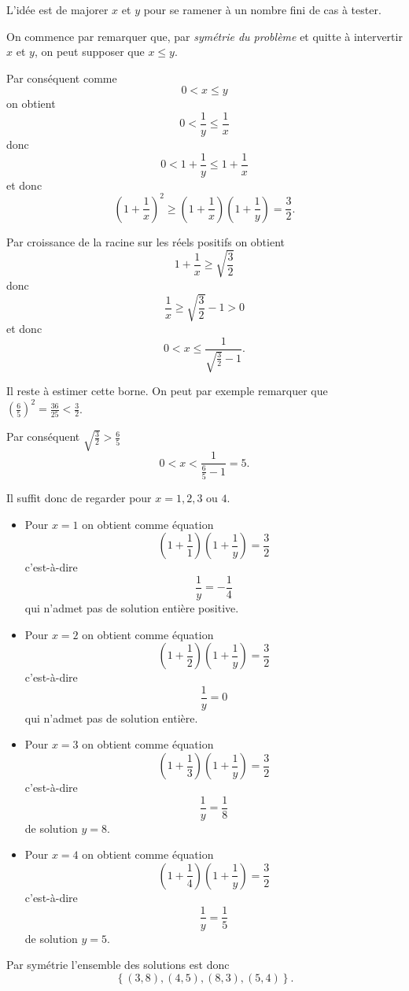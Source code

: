 \begin{sol}
L'idée est de majorer $x$ et $y$ pour se ramener à un nombre fini de cas à tester.

On commence par remarquer que, par \emph{symétrie du problème} et quitte à intervertir $x$ et $y$, on peut supposer que $x \le y$.

Par conséquent comme
$$0 < x \le y$$
on obtient
$$0 < \frac{1}{y} \le \frac{1}{x}$$
donc
$$0 < 1+\frac{1}{y} \le 1+\frac{1}{x}$$
et donc
$$\left(1 + \frac{1}{x} \right)^2 \ge \left( 1 + \frac{1}{x}\right) \left(1 + \frac{1}{y} \right) = \frac{3}{2}.$$

Par croissance de la racine sur les réels positifs on obtient
$$1 + \frac{1}{x} \ge \sqrt{\frac{3}{2}}$$
donc
$$\frac{1}{x} \ge \sqrt{\frac{3}{2}}-1 > 0$$
et donc
$$0 < x \le \frac{1}{\sqrt{\frac{3}{2}}-1}.$$


Il reste à estimer cette borne. On peut par exemple remarquer que $\left( \frac{6}{5}\right)^2 = \frac{36}{25} < \frac{3}{2}$.

Par conséquent $\sqrt{\frac{3}{2}} > \frac{6}{5}$
$$0 < x < \frac{1}{\frac{6}{5}-1} = 5.$$

Il suffit donc de regarder pour $x =1, 2, 3 \text{ ou } 4$.

\begin{itemize}
	\item Pour $x=1$ on obtient comme équation
	$$\left(1 + \frac{1}{1} \right)\left(1 + \frac{1}{y} \right) = \frac{3}{2}$$
	c'est-à-dire
	$$\frac{1}{y} = -\frac{1}{4}$$
	qui n'admet pas de solution entière positive.
	\item Pour $x=2$ on obtient comme équation
	$$\left(1 + \frac{1}{2} \right)\left(1 + \frac{1}{y} \right) = \frac{3}{2}$$
	c'est-à-dire
	$$\frac{1}{y} = 0$$
	qui n'admet pas de solution entière.
	\item Pour $x=3$ on obtient comme équation
	$$\left(1 + \frac{1}{3} \right)\left(1 + \frac{1}{y} \right) = \frac{3}{2}$$
	c'est-à-dire
	$$\frac{1}{y} = \frac{1}{8}$$
	de solution $y=8$.
	\item Pour $x=4$ on obtient comme équation
	$$\left(1 + \frac{1}{4} \right)\left(1 + \frac{1}{y} \right) = \frac{3}{2}$$
	c'est-à-dire
	$$\frac{1}{y} = \frac{1}{5}$$
	de solution $y=5$.
\end{itemize}

Par symétrie l'ensemble des solutions est donc
$$\boxed{\left\lbrace (3,8), (4,5), (8,3), (5,4) \right\rbrace}.$$
\end{sol}


